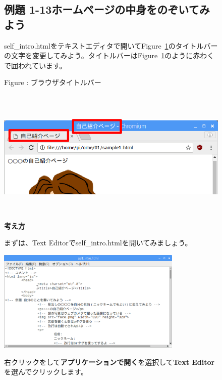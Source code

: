 \documentclass[a4paper,12pt]{jarticle}
\begin{document}
\clearpage
\begin{figure}[ht]
  \subsection{例題
    1-13ホームページの中身をのぞいてみよう}
  self\_intro.htmlをテキストエディタで開いてFigure~\ref{seq:refFigure31}のタイトルバーの文字を変更してみよう。タイトルバーはFigure~\ref{seq:refFigure31}のように赤わくで囲われています。


  \bigskip



  \centering
  \begin{minipage}{17.006cm}
    {\upshape
      Figure {\theFigure\label{seq:refFigure31}}:
      ブラウザタイトルバー}
  \end{minipage}

  \centering
  \includegraphics[width=17.006cm,height=6.482cm]{textbook-img143.png}
  \flushleft
  \textbf{考え方}

  \begin{minipage}{\textwidth}
    \flushleft
    まずは、Text
    Editorでself\_intro.htmlを開いてみましょう。

    \centering
    \includegraphics[width=8.805cm,height=4.856cm]{textbook-img144.png}
    \bigskip

    \flushleft
    右クリックをして\textbf{アプリケーションで開く}を選択して\textbf{Text
      Editor}を選んでクリックします。
    \centering


\end{minipage}
\end{figure}
\end{document}
